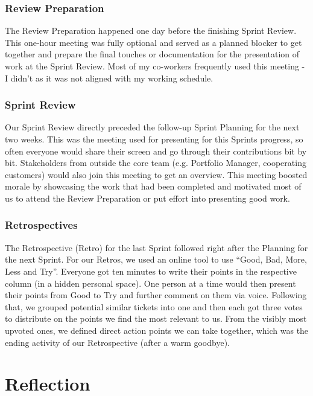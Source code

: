 \documentclass[a4paper]{article}
\begin{document}
\subsubsection{Review Preparation}
The Review Preparation happened one day before the finishing Sprint Review. 
This one-hour meeting was fully optional and served as a planned blocker to get together and prepare the final touches or documentation for the presentation of work at the Sprint Review. 
Most of my co-workers frequently used this meeting - I didn’t as it was not aligned with my working schedule.
\subsubsection{Sprint Review}
Our Sprint Review directly preceded the follow-up Sprint Planning for the next two weeks. 
This was the meeting used for presenting for this Sprints progress, so often everyone would share their screen and go through their contributions bit by bit. 
Stakeholders from outside the core team (e.g. Portfolio Manager, cooperating customers) would also join this meeting to get an overview. 
This meeting boosted morale by showcasing the work that had been completed and motivated most of us to attend the Review Preparation or put effort into presenting good work.
\subsubsection{Retrospectives}
The Retrospective (Retro) for the last Sprint followed right after the Planning for the next Sprint. 
For our Retros, we used an online tool to use “Good, Bad, More, Less and Try”. 
Everyone got ten minutes to write their points in the respective column (in a hidden personal space). 
One person at a time would then present their points from Good to Try and further comment on them via voice. 
Following that, we grouped potential similar tickets into one and then each got three votes to distribute on the points we find the most relevant to us. 
From the visibly most upvoted ones, we defined direct action points we can take together, which was the ending activity of our Retrospective (after a warm goodbye).
\section{Reflection}
\end{document}
